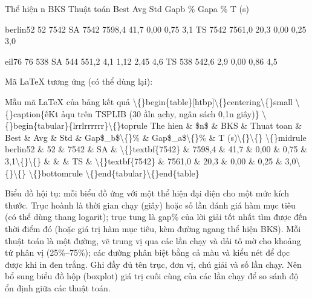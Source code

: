 \documentclass[a4paper,11pt]{article}
\begin{document}
Thể hiện      n     BKS        Thuật toán    Best       Avg     Std    Gapb \%      Gapa \%     T (s)

berlin52     52     7542       SA           7542      7598,4   41,7        0,00        0,75    3,1 TS           7542      7561,0   20,3        0,00        0,25    3,0

eil76        76      538       SA            544       551,2    4,1        1,12        2,45    4,6 TS            538       542,6    2,9        0,00        0,86    4,5

Mã LaTeX tương ứng (có thể dùng lại):

Mẫu mã LaTeX của bảng kết quả \textbackslash\{\}begin\{table\}[htbp]\textbackslash\{\}centering\textbackslash\{\}small \textbackslash\{\}caption\{ếKt ảqu trên TSPLIB (30 ầln ạchy, ngân sách 0,1n giây)\} \textbackslash\{\}begin\{tabular\}\{lrrlrrrrrr\}\textbackslash\{\}toprule The hien \& \$n\$ \& BKS \& Thuat toan \& Best \& Avg \& Std \& Gap\$\_b\$\textbackslash\{\}\% \& Gap\$\_a\$\textbackslash\{\}\% \& T (s)\textbackslash\{\}\textbackslash\{\} \textbackslash\{\}midrule berlin52 \& 52 \& 7542 \& SA \& \textbackslash\{\}textbf\{7542\} \& 7598,4 \& 41,7 \& 0,00 \& 0,75 \& 3,1\textbackslash\{\}\textbackslash\{\} \&     \&    \& TS \& \textbackslash\{\}textbf\{7542\} \& 7561,0 \& 20,3 \& 0,00 \& 0,25 \& 3,0\textbackslash\{\}\textbackslash\{\} \textbackslash\{\}bottomrule \textbackslash\{\}end\{tabular\}\textbackslash\{\}end\{table\}

Biểu đồ hội tụ: mỗi biểu đồ ứng với một thể hiện đại diện cho một mức kích thước. Trục hoành là thời gian chạy (giây) hoặc số lần đánh giá hàm mục tiêu (có thể dùng thang logarit); trục tung là gap\% của lời giải tốt nhất tìm được đến thời điểm đó (hoặc giá trị hàm mục tiêu, kèm đường ngang thể hiện BKS). Mỗi thuật toán là một đường, vẽ trung vị qua các lần chạy và dải tô mờ cho khoảng tứ phân vị (25\%–75\%); các đường phân biệt bằng cả màu và kiểu nét để đọc được khi in đen trắng. Ghi đầy đủ tên trục, đơn vị, chú giải và số lần chạy. Nên bổ sung biểu đồ hộp (boxplot) giá trị cuối cùng của các lần chạy để so sánh độ ổn định giữa các thuật toán.
\end{document}
